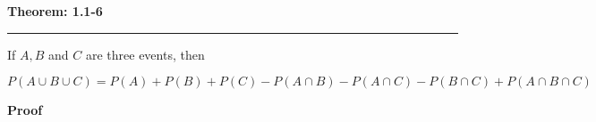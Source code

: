 \nopagenumbers
{\bf Theorem: 1.1-6}
\vskip 1mm
\hrule

\vskip 6pt
If $A,B$ and $C$ are three events, then

$$P(A\cup B\cup C)=P(A)+P(B)+P(C)-P(A\cap B)-P(A\cap C)-P(B\cap C)+P(A\cap B\cap C)$$

\vskip 10pt
{\bf Proof}

\vskip 6pt



\vfill\eject
\bye
